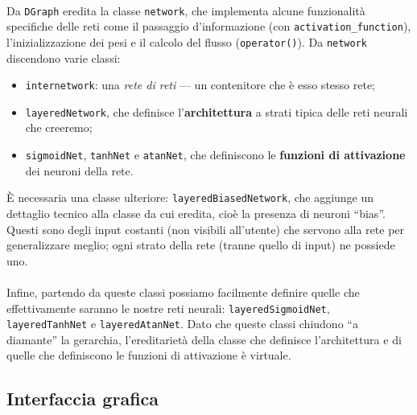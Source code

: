 \documentclass{article}
\begin{document}
\paragraph{} Da \texttt{DGraph} eredita la classe \texttt{network}, che implementa alcune funzionalità specifiche delle reti come il passaggio d'informazione (con \texttt{activation\_function}), l'inizializzazione dei pesi e il calcolo del flusso (\texttt{operator()}). Da \texttt{network} discendono varie classi:
\begin{itemize}
	\item \texttt{internetwork}: una \emph{rete di reti} --- un contenitore che è esso stesso rete;
	\item \texttt{layeredNetwork}, che definisce l'\textbf{architettura} a strati tipica delle reti neurali che creeremo;
	\item \texttt{sigmoidNet}, \texttt{tanhNet} e \texttt{atanNet}, che definiscono le \textbf{funzioni di attivazione} dei neuroni della rete.
\end{itemize}
È necessaria una classe ulteriore: \texttt{layeredBiasedNetwork}, che aggiunge un dettaglio tecnico alla classe da cui eredita, cioè la presenza di neuroni “bias”. Questi sono degli input costanti (non visibili all'utente) che servono alla rete per generalizzare meglio; ogni strato della rete (tranne quello di input) ne possiede uno.

\paragraph{} Infine, partendo da queste classi possiamo facilmente definire quelle che effettivamente saranno le nostre reti neurali: \texttt{layeredSigmoidNet}, \texttt{layeredTanhNet} e \texttt{layeredAtanNet}. Dato che queste classi chiudono “a diamante” la gerarchia, l'ereditarietà della classe che definisce l'architettura e di quelle che definiscono le funzioni di attivazione è virtuale.

\subsection{Interfaccia grafica}
\end{document}
